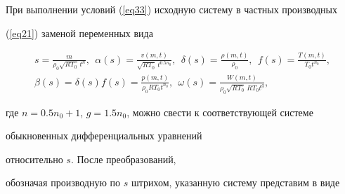 При выполнении условий (\ref{eq33}) исходную систему в частных производных


(\ref{eq21}) заменой переменных вида


\begin{equation}\label{eq34}


\begin{array}{c}


\displaystyle


s=\frac{m}{\rho_0\sqrt{RT_0}\,t^n},\ \


\alpha(s)=\frac{v(m,t)}{\sqrt{RT_0}\,t^{0.5n_0}},\ \


\delta(s)=\frac{\rho(m,t)}{\rho_0},\ \


f(s)=\frac{T(m,t)}{T_0t^{n_0}},\\[4mm]


\displaystyle


\beta(s)=\delta(s)f(s)=\frac{p(m,t)}{\rho_0RT_0t^{n_0}},\ \


\omega(s)=\frac{W(m,t)}{\rho_0\sqrt{RT_0}\,RT_0t^g},


\end{array}


\end{equation}


где $n=0.5n_0+1$, $g=1.5n_0$, можно свести к соответствующей системе


обыкновенных дифференциальных уравнений 


относительно $s$. После преобразований,


обозначая производную по $s$ штрихом, указанную систему представим в виде


